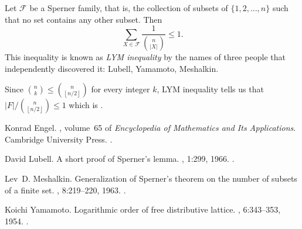 \documentclass[12pt]{article}
\newcommand*{\abs}[1]{\left\lvert #1\right\rvert}
\newcommand*{\floor}[1]{\left\lfloor #1\right\rfloor}
\begin{document}
Let $\mathcal{F}$ be a Sperner family, that is, the collection of
subsets of $\{1,2,\dotsc,n\}$ such that no set contains any other subset.
Then
\begin{equation*}
\sum_{X\in\mathcal{F}} \frac{1}{\binom{n}{\abs{X}}}\leq 1.
\end{equation*}
This inequality is known as \emph{LYM inequality} by the names of
three people that independently discovered it:
Lubell\cite{cite:lubell_lym}, Yamamoto\cite{cite:yamamoto_lym},
Meshalkin\cite{cite:meshalkin_lym}.

Since $\binom{n}{k}\leq \binom{n}{\floor{n/2}}$ for every integer $k$, LYM inequality tells us that $\abs{F}/\binom{n}{\floor{n/2}}\leq 1$ which is .

\begin{thebibliography}{1}

Konrad Engel.
, volume~65 of {\em Encyclopedia of Mathematics
  and Its Applications}.
\newblock Cambridge University Press.
\newblock {}.

David Lubell.
\newblock A short proof of Sperner's lemma.
, 1:299, 1966.
\newblock {}.

Lev~D. Meshalkin.
\newblock Generalization of Sperner's theorem on the number of subsets of a
  finite set.
, 8:219--220, 1963.
\newblock {}.

Koichi Yamamoto.
\newblock Logarithmic order of free distributive lattice.
, 6:343--353, 1954.
\newblock {}.

\end{thebibliography}
\end{document}
